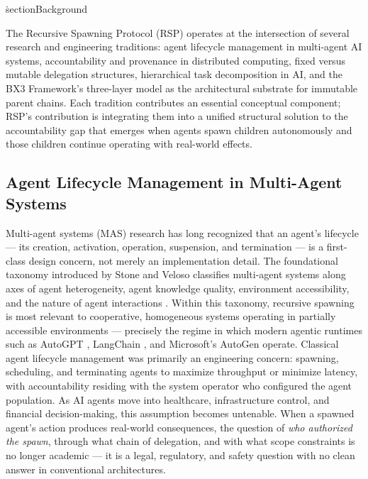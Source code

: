 \.section{Background}
\label{sec:rs-background}

The Recursive Spawning Protocol (RSP) operates at the intersection of several research and engineering traditions: agent lifecycle management in multi-agent AI systems, accountability and provenance in distributed computing, fixed versus mutable delegation structures, hierarchical task decomposition in AI, and the BX3 Framework's three-layer model as the architectural substrate for immutable parent chains. Each tradition contributes an essential conceptual component; RSP's contribution is integrating them into a unified structural solution to the accountability gap that emerges when agents spawn children autonomously and those children continue operating with real-world effects.

\subsection{Agent Lifecycle Management in Multi-Agent Systems}

Multi-agent systems (MAS) research has long recognized that an agent's lifecycle --- its creation, activation, operation, suspension, and termination --- is a first-class design concern, not merely an implementation detail. The foundational taxonomy introduced by Stone and Veloso classifies multi-agent systems along axes of agent heterogeneity, agent knowledge quality, environment accessibility, and the nature of agent interactions \cite{stone2000}. Within this taxonomy, recursive spawning is most relevant to cooperative, homogeneous systems operating in partially accessible environments --- precisely the regime in which modern agentic runtimes such as AutoGPT \cite{autoGPT2023}, LangChain \cite{langchain2023}, and Microsoft's AutoGen \cite{autogen2023} operate. Classical agent lifecycle management was primarily an engineering concern: spawning, scheduling, and terminating agents to maximize throughput or minimize latency, with accountability residing with the system operator who configured the agent population. As AI agents move into healthcare, infrastructure control, and financial decision-making, this assumption becomes untenable. When a spawned agent's action produces real-world consequences, the question of \emph{who authorized the spawn}, through what chain of delegation, and with what scope constraints is no longer academic --- it is a legal, regulatory, and safety question with no clean answer in conventional architectures.

